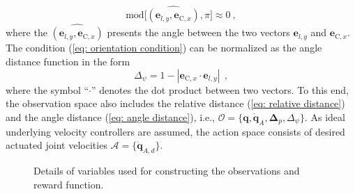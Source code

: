 \begin{equation}
     \mathrm{mod}\bigg[\widehat{(\mathbf{e}_{l,y},\mathbf{e}_{\mathrm{C},x})},\pi \bigg] \approx 0 \:, 
     \label{eq: orientation condition}
\end{equation}
where the $\widehat{(\mathbf{e}_{l,y},\mathbf{e}_{\mathrm{C},x})}$ presents the angle between the two vectors $\mathbf{e}_{l,y}$ and $\mathbf{e}_{\mathrm{C},x}$. 
The condition (\ref{eq: orientation condition}) can be normalized as the angle distance function in the form
\begin{equation}
    \Delta_{\psi} = 1- |\mathbf{e}_{\mathrm{C},x}\cdot \mathbf{e}_{l,y} |\:\:,
    \label{eq: angle distance}
\end{equation}
where the symbol ``$\cdot$'' denotes the dot product between two vectors. 
To this end, the observation space also includes the relative distance (\ref{eq: relative distance}) and the angle distance (\ref{eq: angle distance}), i.e., $\mathcal{O} = \{\mathbf{q},\dot{\mathbf{q}}_{A},\bm{\Delta}_p,\Delta_\psi\}$. As ideal underlying velocity controllers are assumed, the action space consists of desired actuated joint velocities $\mathcal{A} = \{\dot{\mathbf{q}}_{A,d}\}$. 

\begin{figure}[t]
\centering
{}
\vspace{0.1cm}
\caption{Details of variables used for constructing the observations and reward function.}
\label{fig: rl explained}
\vspace{-0.2ex}
\end{figure}
    
